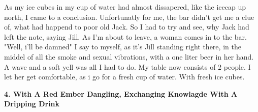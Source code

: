 \documentclass[]{article}
\begin{document}
	
	As my ice cubes in my cup of water had almost dissapered, like the icecap up north, I came to a conclusion. Unfortunatly for me, the bar didn't get me a clue of, what had happend to poor old Jack. So I had to try and see, why Jack had left the note, saying Jill. As I'm about to leave, a woman comes in to the bar. "Well, i'll be damned" I say to myself, as it's Jill standing right there, in the middel of all the smoke and sexual vibrations, with a one liter beer in her hand. A wave and a soft yell was all I had to do. My table now consists of 2 people. I let her get comfortable, as i go for a fresh cup of water. With fresh ice cubes.
	\newpage
	
	\begin{center}
		\large\textbf{4. With A Red Ember Dangling, \newline Exchanging Knowlagde With A Dripping Drink}
	\end{center}
	
\end{document}
